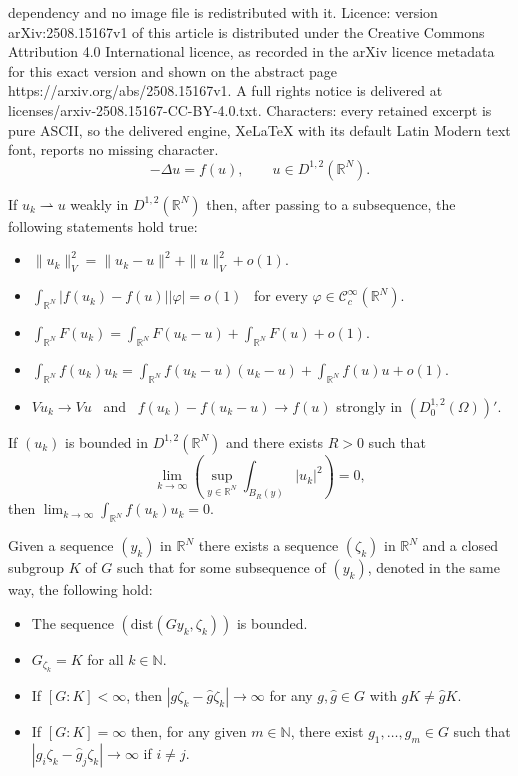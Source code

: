 \documentclass[10pt,a4paper]{amsart}
\def\cC{\mathcal{C}}
\def\irn{\int_{\r^N}}
\def\n{\mathbb{N}}
\def\o{\Omega}
\def\rh{\rightharpoonup}
\def\rn{\mathbb{R}^N}
\def\r{\mathbb{R}}
\def\vp{\varphi}
\def\what{\widehat}
\begin{document}
dependency and no image file is redistributed with it. Licence: version arXiv:2508.15167v1 of this article is distributed under the Creative Commons Attribution 4.0 International licence, as recorded in the arXiv licence metadata for this exact version and shown on the abstract page https://arxiv.org/abs/2508.15167v1. A full rights notice is delivered at licenses/arxiv-2508.15167-CC-BY-4.0.txt. Characters: every retained excerpt is pure ASCII, so the delivered engine, XeLaTeX with its default Latin Modern text font, reports no missing character.
\begin{equation}
\label{eq:limit problem}
-\Delta u = f(u), \qquad u\in D^{1,2}(\rn).
\end{equation}

\begin{lemma}\label{lem:cm} 
If $u_k\rh u$ weakly in $D^{1,2}(\rn)$ then, after passing to a subsequence, the following statements hold true:
\begin{itemize}
\item[$(a)$] $\|u_k\|_V^2 = \|u_k -u\|^2 + \|u\|_V^2 + o(1).$
\item[$(b)$] $\irn |f(u_k) - f(u)| |\vp|=o(1)$ \ for every $\vp\in\cC^{\infty}_{c}(\rn)$.
\item[$(c)$] $\irn F(u_k) = \irn F(u_k - u) + \irn F(u) + o(1)$.
\item[$(d)$] $\irn f(u_k)u_k = \irn f(u_k - u)(u_k-u) + \irn f(u)u + o(1)$.
\item[$(e)$] $Vu_k\to Vu$ \ and \ $f(u_k) - f(u_k -u) \to f(u)$  strongly in $(D^{1,2}_0(\o))'$.
\end{itemize}
\end{lemma}

\begin{lemma}\label{lem:lions} 
If $(u_k)$ is bounded in $D^{1,2}(\rn)$ and there exists $R>0$ such that 
$$\lim_{k\to\infty} \left( \sup_{y \in \rn} \int_{B_R(y)} |u_k|^2 \right)=0,$$
then $\lim_{k\to\infty} \irn f(u_k)u_k=0.$
\end{lemma}

\begin{lemma} \label{lem:K} 
Given a sequence $(y_k)$ in $\rn$ there exists a sequence $(\zeta_k)$ in $\rn$ and a closed subgroup $K$ of $G$ such that for some subsequence of $(y_k)$, denoted in the same way, the following hold:
\begin{itemize}
\item [$(a)$]The sequence $(\mathrm{dist} (Gy_k,\zeta_k))$ is bounded.
\item[$(b)$] $G_{\zeta_k}= K$ for all $k\in\n$.
\item[$(c)$] If $[G:K]<\infty$, then $|g\zeta_k - \what g \zeta_k|\to\infty$ for any $g,\what g\in G$ with $gK\neq \what g K$.
\item[$(d)$] If $[G:K]=\infty$ then, for any given $m\in\n$, there exist $g_1,\ldots,g_m\in G$ such that $|g_i\zeta_k - \what g_j\zeta_k|\to\infty$ if $i\neq j$.
\end{itemize}
\end{lemma}
\end{document}
